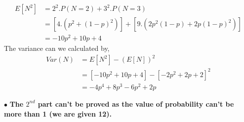 \documentclass{article}
\begin{document}
\begin{enumerate}
\begin{enumerate}
\begin{align*}
            E[N^2] &= 2^2.P(N=2) + 3^2.P(N=3)\\
            &= \left[4.\left(p^2 + (1-p)^2\right)\right] + \left[9.\left(2p^2(1-p) + 2p(1-p)^2\right)\right]\\
            &= -10p^2 + 10p + 4
        \end{align*}
        The variance can we calculated by,
        \begin{align*}
            Var(N) &= E[N^2] - (E[N])^2\\
            &= \left[-10p^2 + 10p + 4\right] - \left[-2p^2 + 2p + 2\right]^2\\
            &= -4p^4 + 8p^3 - 6p^2 + 2p
        \end{align*}

        $\bullet$ \textbf{The \(2^{nd}\) part can't be proved as the value of probability can't be more than 1 (we are given 12).}
    \end{enumerate}


\end{enumerate}
\end{document}

